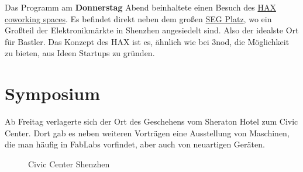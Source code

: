 \documentclass{\basedir/fablab-document}
\begin{document}
Das Programm am \textbf{Donnerstag} Abend beinhaltete einen Besuch des
\href{https://hax.co/about/}{HAX coworking spaces}. Es befindet direkt neben
dem großen \href{https://en.wikipedia.org/wiki/SEG_Plaza}{SEG Platz},
wo ein Großteil der Elektronikmärkte in Shenzhen angesiedelt sind. Also
der idealste Ort für Bastler. Das Konzept des HAX ist es, ähnlich wie
bei 3nod, die Möglichkeit zu bieten, aus Ideen Startups zu gründen.

\section*{Symposium}

Ab Freitag verlagerte sich der Ort des Geschehens vom Sheraton Hotel zum
Civic Center. Dort gab es neben weiteren Vorträgen eine Ausstellung
von Maschinen, die man häufig in FabLabs vorfindet, aber auch von
neuartigen Geräten.

\begin{figure}[h]
	\noindent{}
	\caption{Civic Center Shenzhen}
	\label{civic_center}
\end{figure}
\end{document}
